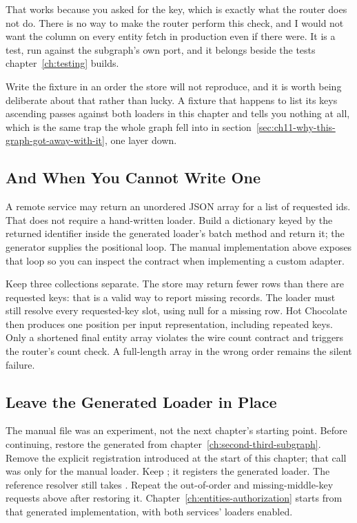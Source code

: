 %
That works because you asked for the key, which is exactly what the router does
not do. There is no way to make the router perform this check, and I would not
want the column on every entity fetch in production even if there were. It is a
test, run against the subgraph's own port, and it belongs beside the tests
chapter~\ref{ch:testing} builds.

%
Write the fixture in an order the store will not reproduce, and it is worth
being deliberate about that rather than lucky. A fixture that happens to list
its keys ascending passes against both loaders in this chapter and tells you
nothing at all, which is the same trap the whole graph fell into in
section~\ref{sec:ch11-why-this-graph-got-away-with-it}, one layer down.

\subsection{And When You Cannot Write One}

%
A remote service may return an unordered JSON array for a list of requested
ids. That does not require a hand-written loader. Build a dictionary keyed by
the returned identifier inside the generated loader's batch method and return
it; the generator supplies the positional loop. The manual implementation
above exposes that loop so you can inspect the contract when implementing a
custom adapter.

%
Keep three collections separate. The store may return fewer rows than there
are requested keys: that is a valid way to report missing records. The loader
must still resolve every requested-key slot, using null for a missing row.
Hot Chocolate then produces one  position per input
representation, including repeated keys. Only a shortened final entity array
violates the wire count contract and triggers the router's count check.
A full-length array in the wrong order remains the silent failure.

\subsection{Leave the Generated Loader in Place}

The manual file was an experiment, not the next chapter's starting point.
Before continuing, restore the generated  from
chapter~\ref{ch:second-third-subgraph}. Remove the explicit
 registration introduced at the start of this chapter;
that call was only for the manual loader.
Keep ; it registers the generated
loader. The reference resolver still takes .
Repeat the out-of-order and missing-middle-key requests above after restoring
it. Chapter~\ref{ch:entities-authorization} starts from that generated
implementation, with both services' loaders enabled.
%
